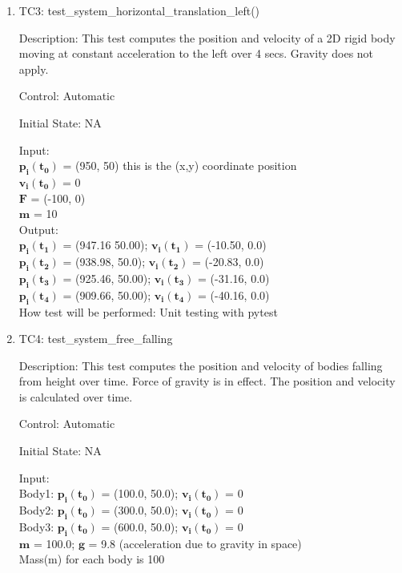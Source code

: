 \documentclass[12pt, titlepage]{article}
\begin{document}
\begin{enumerate}
\item{TC3: test\_system\_horizontal\_translation\_left()\\}

Description: This test computes the position and velocity of a 2D rigid body moving at constant acceleration to the left over 4 secs. Gravity does not apply.

Control: Automatic

Initial State: NA

Input:\\ 
$\mathbf{p_i}$$\mathbf{(t_0)}$ = (950, 50) this is the (x,y) coordinate position\\
$\mathbf{v_i}$$\mathbf{(t_0)}$ = 0\\
$\mathbf{F}$$\mathbf{}$ = (-100, 0)\\
$\mathbf{m}$$ \mathbf{}$ = 10\\ 	   

Output:\\
$\mathbf{p_i}$$\mathbf{(t_1)}$ = (947.16 50.00);
$\mathbf{v_i}$$\mathbf{(t_1)}$ = (-10.50, 0.0)\\ 
$\mathbf{p_i}$$\mathbf{(t_2)}$ = (938.98, 50.0);
$\mathbf{v_i}$$\mathbf{(t_2)}$ = (-20.83, 0.0)\\ 
$\mathbf{p_i}$$\mathbf{(t_3)}$ = (925.46, 50.00);
$\mathbf{v_i}$$\mathbf{(t_3)}$ = (-31.16, 0.0)\\
$\mathbf{p_i}$$\mathbf{(t_4)}$ = (909.66, 50.00);
$\mathbf{v_i}$$\mathbf{(t_4)}$ = (-40.16, 0.0)\\  

How test will be performed: Unit testing with pytest

\item{TC4: test\_system\_free\_falling\\}

Description: This test computes the position and velocity of bodies falling from height over time. Force of gravity is in effect. The position and velocity is calculated over time. 

Control: Automatic

Initial State: NA

Input: \\
Body1: $\mathbf{p_i}$$\mathbf{(t_0)}$ = (100.0, 50.0); $\mathbf{v_i}$$\mathbf{(t_0)}$ = 0\\
Body2: $\mathbf{p_i}$$\mathbf{(t_0)}$ = (300.0, 50.0); $\mathbf{v_i}$$\mathbf{(t_0)}$ = 0\\
Body3: $\mathbf{p_i}$$\mathbf{(t_0)}$ = (600.0, 50.0); $\mathbf{v_i}$$\mathbf{(t_0)}$ = 0\\
$\mathbf{m}$$ \mathbf{}$ = 100.0;
$\mathbf{g}$$\mathbf{}$ = 9.8 (acceleration due to gravity in space)\\
Mass(m) for each body is 100\\


\end{enumerate}
\end{document}
